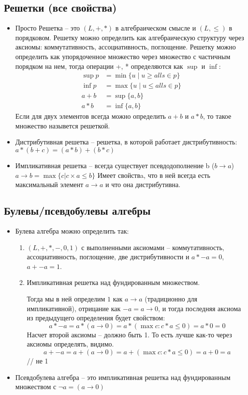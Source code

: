 \subsection{Решетки (все свойства)}
\label{sec-2-8}
\begin{itemize}
\item Просто Решетка -- это $(L, +, *)$ в алгебраическом смысле и $(L, \le)$ в порядковом.
Решетку можно определить как алгебраическую структуру через
аксиомы: коммутативность, ассоциативность, поглощение.
Решетку можно определить как упорядоченное множество через
множество с частичным порядком на нем, тогда операции +, * определяются
как $\sup$ и $\inf$:
\begin{align*}
    \sup p &= \min \{u \mid u \ge all s \in p\} \\
    \inf p &= \max \{u \mid u \le all s \in p\} \\
    a + b  &= \sup \{a, b\} \\
    a * b  &= \inf \{a, b\}
\end{align*}
Если для двух элементов всегда можно определить $a + b$ и $a * b$, то такое
множество назывется решеткой.
\item Дистрибутивная решетка -- решетка, в которой работает дистрибутивность:
$a * (b + c) = (a * b) + (b * c)$
\item Импликативная решетка -- всегда существует псевдодополнение b ($b \to a$)
$a \to b = \max \lbrace c | c \times a \le b \rbrace$
Имеет свойствa, что в ней всегда есть максимальный элемент $a \to a$ и что
она дистрибутивна.
\end{itemize}
\subsection{Булевы/псевдобулевы алгебры}
\label{sec-2-9}
\begin{itemize}
\item Булева алгебра можно определить так:
\begin{enumerate}
\item $(L, +, *, -, 0, 1)$ с выполненными аксиомами -- коммутативность, ассоциативность,
    поглощение, две дистрибутивности и $a * -a = 0$,
$a + -a = 1$.
\item Импликативная решетка над фундированным множеством.

Тогда мы в ней определим $1$ как $a \to a$ (традиционно для импликативной),
отрицание как $-a = a \to 0$, и тогда последняя аксиома из
предыдущего определения будет свойством:
\[a * -a = a * (a \to 0) = a * (\max c: c * a \le 0) = a * 0 = 0\]
Насчет второй аксиомы -- должно быть 1. То есть лучше как-то
через аксиомы определять, видимо.
\[a + -a = a + (a \to 0) = a + (\max c: c * a \le 0) = a + 0 = a\] // не 1
\end{enumerate}
\item Псевдобулева алгебра -- это импликативная решетка над фундированным
множеством с $\lnot a = (a \to 0)$
\end{itemize}
